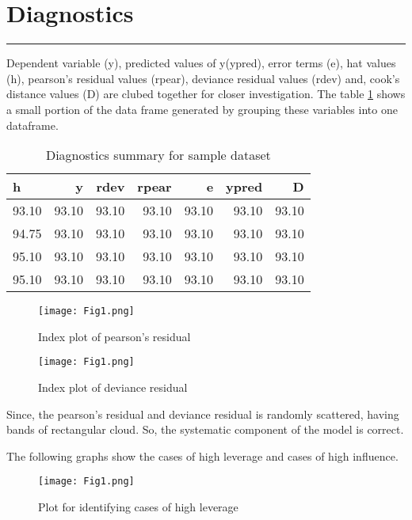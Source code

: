 \documentclass[a4paper,12pt, notitlepage]{article}
\begin{document}
\section{Diagnostics}
\rule{\textwidth}{0.5pt}
\par
Dependent variable (y), predicted values of y(ypred), error terms (e), hat values (h), pearson's residual values (rpear), deviance residual values (rdev) and, cook's distance values (D) are clubed together for closer investigation. The table \ref{table:6} shows a small portion of the data frame generated by grouping these variables into one dataframe.

\begin{table}[!htbp]
\centering
\begin{tabular}{ |l|r|r|r|r|r|r| } 
\hline \rowcolor{Gray}
h & y & rdev & rpear & e & ypred & D\\
\hline
93.10 & 93.10 & 93.10 & 93.10 & 93.10 & 93.10 & 93.10 \\ 
94.75 & 93.10 & 93.10 & 93.10 & 93.10 & 93.10 & 93.10 \\ 
95.10 & 93.10 & 93.10 & 93.10 & 93.10 & 93.10 & 93.10 \\ 
95.10 & 93.10 & 93.10 & 93.10 & 93.10 & 93.10 & 93.10 \\ 
\hline
\end{tabular}
\caption{Diagnostics summary for sample dataset}
\label{table:6}
\end{table}

\begin{figure}[!htbp]
    \centering
    \texttt{[image: Fig1.png]}
    \caption{Index plot of pearson's residual}
    \label{fig:rpear1}
\end{figure}

\begin{figure}[!htbp]
    \centering
    \texttt{[image: Fig1.png]}
    \caption{Index plot of deviance residual}
    \label{fig:rdev1}
\end{figure}

Since, the pearson's residual and deviance residual is randomly scattered, having bands of rectangular cloud. So, the systematic component of the model is correct. 

The following graphs show the cases of high leverage and cases of high influence.

\begin{figure}[!htbp]
    \centering
    \texttt{[image: Fig1.png]}
    \caption{Plot for identifying cases of high leverage}
    \label{fig:highleverage1}
\end{figure}
\end{document}

